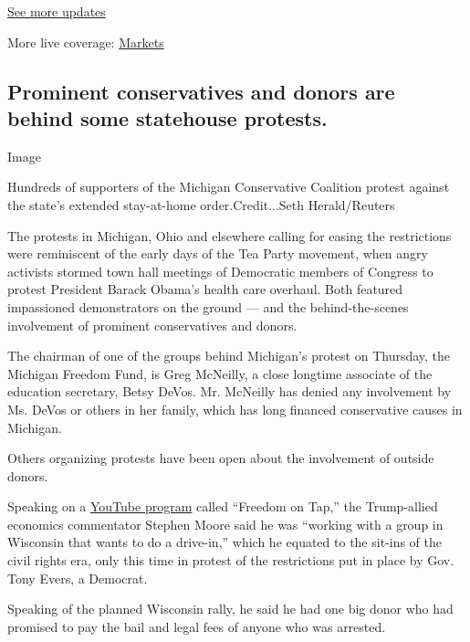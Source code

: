 \href{https://www.nytimes3xbfgragh.onion/2020/09/08/world/covid-19-coronavirus.html?action=click\&pgtype=Article\&state=default\&region=MAIN_CONTENT_1\&context=storylines_live_updates}{See
more updates}

More live coverage:
\href{https://www.nytimes3xbfgragh.onion/live/2020/09/08/business/stock-market-today-coronavirus?action=click\&pgtype=Article\&state=default\&region=MAIN_CONTENT_1\&context=storylines_live_updates}{Markets}

\hypertarget{prominent-conservatives-and-donors-are-behind-some-statehouse-protests}{%
\subsection{Prominent conservatives and donors are behind some
statehouse
protests.}\label{prominent-conservatives-and-donors-are-behind-some-statehouse-protests}}

Image

Hundreds of supporters of the Michigan Conservative Coalition protest
against the state's extended stay-at-home order.Credit...Seth
Herald/Reuters

The protests in Michigan, Ohio and elsewhere calling for easing the
restrictions were reminiscent of the early days of the Tea Party
movement, when angry activists stormed town hall meetings of Democratic
members of Congress to protest President Barack Obama's health care
overhaul. Both featured impassioned demonstrators on the ground --- and
the behind-the-scenes involvement of prominent conservatives and donors.

The chairman of one of the groups behind Michigan's protest on Thursday,
the Michigan Freedom Fund, is Greg McNeilly, a close longtime associate
of the education secretary, Betsy DeVos. Mr. McNeilly has denied any
involvement by Ms. DeVos or others in her family, which has long
financed conservative causes in Michigan.

Others organizing protests have been open about the involvement of
outside donors.

Speaking on a
\href{https://www.youtube.com/watch?v=2h7czFYx6-s\&feature=youtu.be\&t=856}{YouTube
program} called ``Freedom on Tap,'' the Trump-allied economics
commentator Stephen Moore said he was ``working with a group in
Wisconsin that wants to do a drive-in,'' which he equated to the sit-ins
of the civil rights era, only this time in protest of the restrictions
put in place by Gov. Tony Evers, a Democrat.

Speaking of the planned Wisconsin rally, he said he had one big donor
who had promised to pay the bail and legal fees of anyone who was
arrested.

